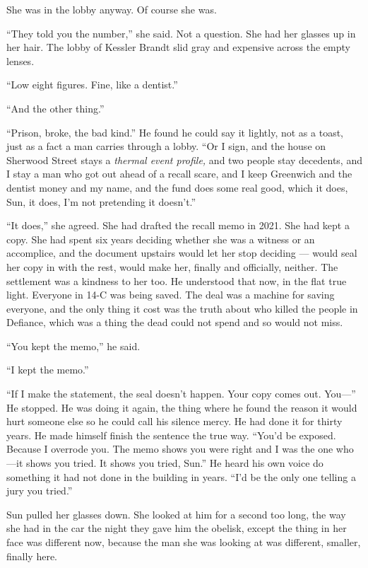 \documentclass[11pt,openany]{book}
\begin{document}
She was in the lobby anyway. Of course she was.

``They told you the number,'' she said. Not a question. She had her glasses up in her hair. The lobby of Kessler Brandt slid gray and expensive across the empty lenses.

``Low eight figures. Fine, like a dentist.''

``And the other thing.''

``Prison, broke, the bad kind.'' He found he could say it lightly, not as a toast, just as a fact a man carries through a lobby. ``Or I sign, and the house on Sherwood Street stays a \textit{thermal event profile,} and two people stay decedents, and I stay a man who got out ahead of a recall scare, and I keep Greenwich and the dentist money and my name, and the fund does some real good, which it does, Sun, it does, I'm not pretending it doesn't.''

``It does,'' she agreed. She had drafted the recall memo in 2021. She had kept a copy. She had spent six years deciding whether she was a witness or an accomplice, and the document upstairs would let her stop deciding --- would seal her copy in with the rest, would make her, finally and officially, neither. The settlement was a kindness to her too. He understood that now, in the flat true light. Everyone in 14-C was being saved. The deal was a machine for saving everyone, and the only thing it cost was the truth about who killed the people in Defiance, which was a thing the dead could not spend and so would not miss.

``You kept the memo,'' he said.

``I kept the memo.''

``If I make the statement, the seal doesn't happen. Your copy comes out. You---'' He stopped. He was doing it again, the thing where he found the reason it would hurt someone else so he could call his silence mercy. He had done it for thirty years. He made himself finish the sentence the true way. ``You'd be exposed. Because I overrode you. The memo shows you were right and I was the one who---it shows you tried. It shows you tried, Sun.'' He heard his own voice do something it had not done in the building in years. ``I'd be the only one telling a jury you tried.''

Sun pulled her glasses down. She looked at him for a second too long, the way she had in the car the night they gave him the obelisk, except the thing in her face was different now, because the man she was looking at was different, smaller, finally here.
\end{document}

